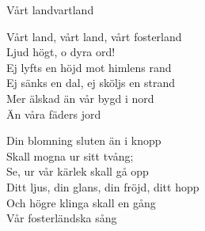 \begin{song}{Vårt land}{vartland}
\begin{vers}
Vårt land, vårt land, vårt fosterland\\
Ljud högt, o dyra ord!\\
Ej lyfts en höjd mot himlens rand\\
Ej sänks en dal, ej sköljs en strand\\
Mer älskad än vår bygd i nord\\
Än våra fäders jord\\
\end{vers}
\begin{vers}
Din blomning sluten än i knopp\\
Skall mogna ur sitt tvång;\\
Se, ur vår kärlek skall gå opp\\
Ditt ljus, din glans, din fröjd, ditt hopp\\
Och högre klinga skall en gång\\
Vår fosterländska sång\\
\end{vers}
\end{song}
